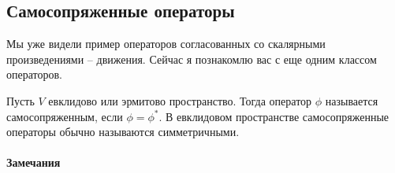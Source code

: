 \subsection{Самосопряженные операторы}

Мы уже видели пример операторов согласованных со скалярными произведениями -- движения. Сейчас я познакомлю вас с еще одним классом операторов.

\begin{definition}
Пусть $V$ евклидово или эрмитово пространство. Тогда оператор $\phi$ называется самосопряженным, если $\phi = \phi^*$. В евклидовом пространстве самосопряженные операторы обычно называются симметричными.
\end{definition}

\paragraph{Замечания}

